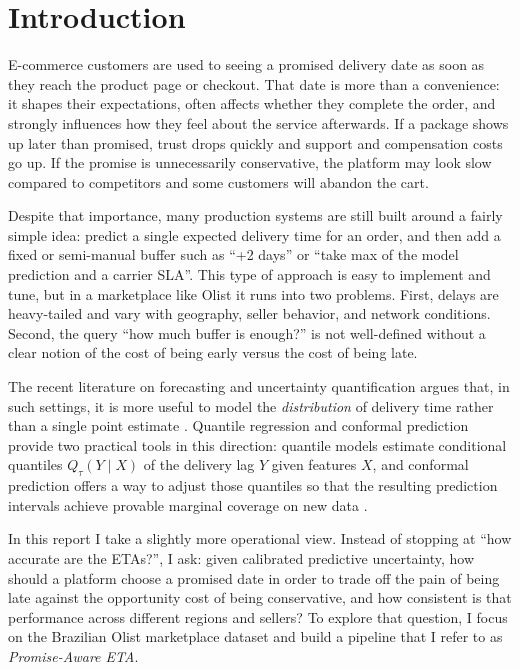 \documentclass[10pt,twocolumn]{article}
\begin{document}
\section{Introduction}
E-commerce customers are used to seeing a promised delivery date as soon as they reach the product page or checkout. That date is more than a convenience: it shapes their expectations, often affects whether they complete the order, and strongly influences how they feel about the service afterwards. If a package shows up later than promised, trust drops quickly and support and compensation costs go up. If the promise is unnecessarily conservative, the platform may look slow compared to competitors and some customers will abandon the cart.

Despite that importance, many production systems are still built around a fairly simple idea: predict a single expected delivery time for an order, and then add a fixed or semi-manual buffer such as ``+2 days'' or ``take max of the model prediction and a carrier SLA''. This type of approach is easy to implement and tune, but in a marketplace like Olist it runs into two problems. First, delays are heavy-tailed and vary with geography, seller behavior, and network conditions. Second, the query ``how much buffer is enough?'' is not well-defined without a clear notion of the cost of being early versus the cost of being late.

The recent literature on forecasting and uncertainty quantification argues that, in such settings, it is more useful to model the \emph{distribution} of delivery time rather than a single point estimate \citep{koenker1978,koenker2001,lightgbm2017,zhang2023calibration}. Quantile regression and conformal prediction provide two practical tools in this direction: quantile models estimate conditional quantiles $Q_\tau(Y \mid X)$ of the delivery lag $Y$ given features $X$, and conformal prediction offers a way to adjust those quantiles so that the resulting prediction intervals achieve provable marginal coverage on new data \citep{romano2019conformalized,angelopoulos2021gentle}.

In this report I take a slightly more operational view. Instead of stopping at “how accurate are the ETAs?”, I ask: given calibrated predictive uncertainty, how should a platform choose a promised date in order to trade off the pain of being late against the opportunity cost of being conservative, and how consistent is that performance across different regions and sellers? To explore that question, I focus on the Brazilian Olist marketplace dataset \citep{olistdataset} and build a pipeline that I refer to as \emph{Promise-Aware ETA}.
\end{document}
